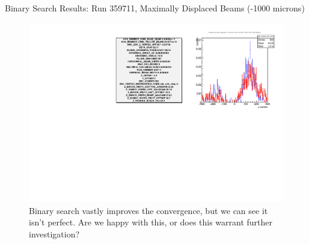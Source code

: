 \begin{frame}{ Binary Search Results: Run 359711, Maximally Displaced Beams (-1000 microns) }
\begin{figure}
\begin{center}
\includegraphics[width=\linewidth]{../RootFinding/figs/359711_min_overlap_binary_search.pdf}
\end{center}
\caption{Binary search vastly improves the convergence, but we can see it isn't
perfect. Are we happy with this, or does this warrant further investigation?}
\label{fig:359711_min_overlap_binary_search}
\end{figure}
\end{frame}


